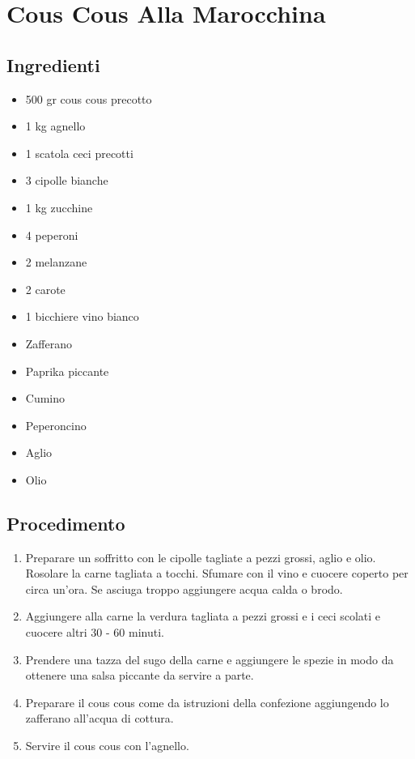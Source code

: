 \section{Cous Cous Alla Marocchina}
\subsection{Ingredienti}
\begin{itemize}
\item 500 gr cous cous precotto  
\item 1 kg agnello  
\item 1 scatola ceci precotti  
\item 3 cipolle bianche  
\item 1 kg zucchine  
\item 4 peperoni  
\item 2 melanzane  
\item 2 carote  
\item 1 bicchiere vino bianco  
\item Zafferano  
\item Paprika piccante  
\item Cumino  
\item Peperoncino  
\item Aglio  
\item Olio
\end{itemize}
\subsection{Procedimento}
\begin{enumerate}
\item  Preparare un soffritto con le cipolle tagliate a pezzi grossi, aglio e olio. Rosolare la carne tagliata a tocchi. Sfumare con il vino e cuocere coperto per circa un'ora. Se asciuga troppo aggiungere acqua calda o brodo.  
\item  Aggiungere alla carne la verdura tagliata a pezzi grossi e i ceci scolati e cuocere altri 30 - 60 minuti.  
\item  Prendere una tazza del sugo della carne e aggiungere le spezie in modo da ottenere una salsa piccante da servire a parte.  
\item  Preparare il cous cous come da istruzioni della confezione aggiungendo lo zafferano all'acqua di cottura.  
\item  Servire il cous cous con l'agnello.
\end{enumerate}
